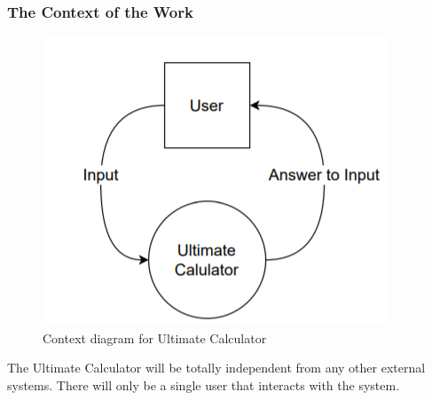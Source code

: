 \documentclass[12pt, titlepage]{article}
\begin{document}
\subsubsection{The Context of the Work}
\begin{figure}[H]
    \centering
    \includegraphics[scale=0.5]{Context.png}
    \caption{Context diagram for Ultimate Calculator}
    \label{fig:context}
\end{figure}
The Ultimate Calculator will be totally independent from any other external systems. There will only be a single user that interacts with the system.
\end{document}
